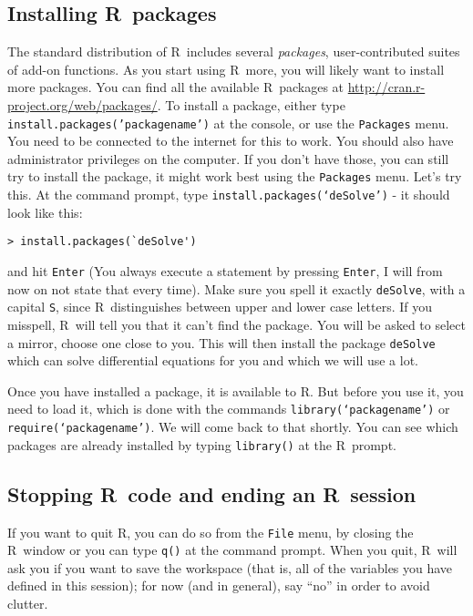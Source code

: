 \documentclass [11pt]{article}
\newcommand{\code}[1]{{\tt #1}}
\newcommand\R{{\sf R}}
\numberwithin{exercise}{section}
\begin{document}
\subsection{Installing \R\ packages}
The standard distribution of \R\ includes several \emph{packages},
user-contributed suites of add-on functions. As you start using \R\ more, you will likely want to install more packages. 
You can find all the available \R\ packages at \url{http://cran.r-project.org/web/packages/}. 
To install a package, either type \code{install.packages('packagename')} at the console, or use the 
\code{Packages} menu. You need to be connected to the internet for this to work. You should also have administrator privileges on the computer. If you don't have those, you can still try to install the package, it might work best using the \code{Packages} menu. 
Let's try this. At the command prompt, type \code{install.packages(`deSolve')} - it should look like this:
\vspace{-0.1in}
\begin{verbatim}
> install.packages(`deSolve')
\end{verbatim}
\vspace{-0.1in}
and hit \code{Enter} (You always execute a statement by pressing \code{Enter}, I will from now on not state that every time). 
Make sure you spell it exactly \code{deSolve}, with a capital \code{S}, since \R\ distinguishes between upper and lower case letters. If you misspell, \R\ will tell you that it can't find the package. You will be asked to select a mirror, choose one close to you. This will then install the package \code{deSolve} which can solve differential equations for you and which we will use a lot. 

Once you have installed a package, it is available to \R. But before you use it, you need to load it, which is done with the commands \code{library(`packagename')} or \code{require(`packagename')}. We will come back to that shortly. You can see which packages are already installed by typing \code{library()} at the \R\ prompt.


\subsection{Stopping \R\ code and ending an \R\ session}
If you want to quit \R, you can do so from the \code{File} menu, by closing the \R\ window or you can type \code{q()} at the 
command prompt. When you quit, \R\ will ask you if you want to save the workspace (that is, all of the variables you have defined in this session); for now (and in general), say ``no'' in order to avoid clutter.
\end{document}
